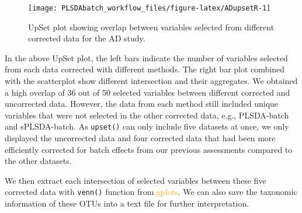 \documentclass[
]{book}
\newenvironment{Shaded}{\begin{snugshade}}{\end{snugshade}}
\newcommand{\AttributeTok}[1]{\textcolor[rgb]{0.77,0.63,0.00}{#1}}
\newcommand{\ConstantTok}[1]{\textcolor[rgb]{0.00,0.00,0.00}{#1}}
\newcommand{\ControlFlowTok}[1]{\textcolor[rgb]{0.13,0.29,0.53}{\textbf{#1}}}
\newcommand{\FunctionTok}[1]{\textcolor[rgb]{0.00,0.00,0.00}{#1}}
\newcommand{\NormalTok}[1]{#1}
\newcommand{\OtherTok}[1]{\textcolor[rgb]{0.56,0.35,0.01}{#1}}
\newcommand{\SpecialCharTok}[1]{\textcolor[rgb]{0.00,0.00,0.00}{#1}}
\newcommand{\StringTok}[1]{\textcolor[rgb]{0.31,0.60,0.02}{#1}}
\begin{document}
\begin{figure}

{\centering \texttt{[image: PLSDAbatch\_workflow\_files/figure-latex/ADupsetR-1]} 

}

\caption{UpSet plot showing overlap between variables selected from different corrected data for the AD study.}\label{fig:ADupsetR}
\end{figure}

In the above UpSet plot, the left bars indicate the number of variables selected from each data corrected with different methods. The right bar plot combined with the scatterplot show different intersection and their aggregates. We obtained a high overlap of 36 out of 50 selected variables between different corrected and uncorrected data. However, the data from each method still included unique variables that were not selected in the other corrected data, e.g., PLSDA-batch and sPLSDA-batch. As \texttt{upset()} can only include five datasets at once, we only displayed the uncorrected data and four corrected data that had been more efficiently corrected for batch effects from our previous assessments compared to the other datasets.

We then extract each intersection of selected variables between these five corrected data with \texttt{venn()} function from \textcolor{orange}{gplots}. We can also save the taxonomic information of these OTUs into a text file for further interpretation.

\begin{Shaded}
\end{Shaded}
\end{document}
